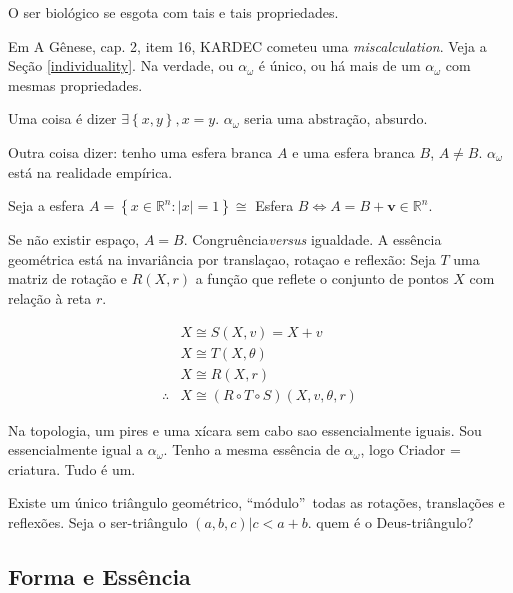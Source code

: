 \documentclass[12pt,a4paper]{article}
\begin{document}
			O ser biol\'ogico se esgota com tais e tais propriedades.

			\begin{flushright}
			\end{flushright}

			Em A G\^enese\cite{genese}, cap. 2, item 16, KARDEC cometeu uma \emph{miscalculation}. Veja a Se\c{c}\~ao \ref{individuality}. Na verdade, ou $ \alpha_\omega $ \'e \'unico, ou h\'a mais de um $ \alpha_\omega $ com mesmas propriedades.

			Uma coisa \'e dizer $ \exists \left\{ x, y \right\} , x = y $. $ \alpha_\omega $ seria uma abstra\c{c}\~ao, absurdo.

			Outra coisa dizer: tenho uma esfera branca $A$ e uma esfera branca $B$, $A \neq B$. $ \alpha_\omega $ est\'a na realidade emp\'irica.

			Seja a esfera $A = \left\{x \in \mathbb{R} ^ n : |x| = 1 \right\} \cong $ Esfera $B \Leftrightarrow A = B + \mathbf{v} \in \mathbb{R} ^ n$.

			Se n\~ao existir espa\c{c}o, $A = B$. Congru\^encia\footnotemark[1] \emph{versus} igualdade. A ess\^encia geom\'etrica est\'a na invari\^ancia por transla\c{c}ao, rota\c{c}ao e reflex\~ao: Seja $T$ uma matriz de rota\c{c}\~ao e $R(X, r)$ a fun\c{c}\~ao que reflete o conjunto de pontos $X$ com rela\c{c}\~ao \`a reta $r$.


			\begin{align*}
				&X \cong S(X,v) = X + v \\
				&X \cong T(X, \theta) \\
				&X \cong R(X, r) \\
				\therefore &X \cong (R \circ T \circ S) (X, v, \theta, r)
			\end{align*}

			Na topologia, um pires e uma x\'icara sem cabo sao essencialmente iguais. Sou essencialmente igual a $\alpha_\omega$. Tenho a mesma ess\^encia de $\alpha_\omega$, logo Criador = criatura. Tudo \'e um.

			Existe um \'unico tri\^angulo geom\'etrico, \textquotedblleft m\'odulo\textquotedblright\, todas as rota\c{c}\~oes, transla\c{c}\~oes e reflex\~oes. Seja o ser-tri\^angulo $(a,b,c) | c < a + b$. quem \'e o Deus-tri\^angulo?

		\subsection{Forma e Ess\^encia}\label{essencia}
			\begin{flushright}
			\end{flushright}
\end{document}
